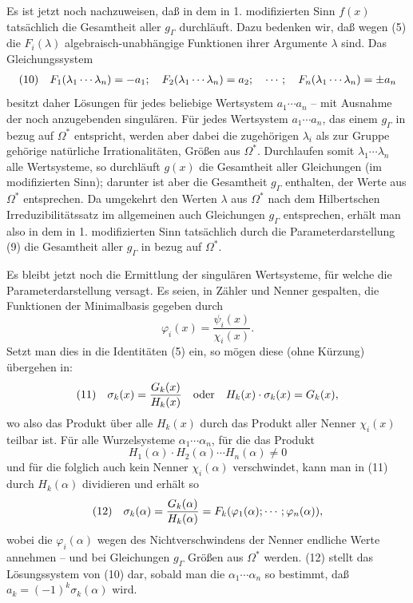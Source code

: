 Es ist jetzt noch nachzuweisen, daß in dem in 1. modifizierten Sinn $f(x)$ tatsächlich die Gesamtheit aller $g_\Gamma$ durchläuft. Dazu bedenken wir, daß wegen (5) die $F_i(\lambda)$ algebraisch-unabhängige Funktionen ihrer Argumente $\lambda$ sind. Das Gleichungssystem
\[
\begin{array}{@{}l@{\quad}l@{}}
(10)& \displaystyle F_1(\lambda_1\cdots\lambda_n)=-a_1;\quad F_2(\lambda_1\cdots\lambda_n)=a_2;\quad \cdots;\quad F_n(\lambda_1\cdots\lambda_n)=\pm a_n
\end{array}
\]
besitzt daher Lösungen für jedes beliebige Wertsystem $a_1\cdots a_n$ -- mit Ausnahme der noch anzugebenden singulären. Für jedes Wertsystem $a_1\cdots a_n$, das einem $g_\Gamma$ in bezug auf $\Omega^*$ entspricht, werden aber dabei die zugehörigen $\lambda_i$ als zur Gruppe gehörige natürliche Irrationalitäten, Größen aus $\Omega^*$. Durchlaufen somit $\lambda_1\cdots\lambda_n$ alle Wertsysteme, so durchläuft $g(x)$ die Gesamtheit aller Gleichungen (im modifizierten Sinn); darunter ist aber die Gesamtheit $g_\Gamma$ enthalten, der Werte aus $\Omega^*$ entsprechen. Da umgekehrt den Werten $\lambda$ aus $\Omega^*$ nach dem Hilbertschen Irreduzibilitätssatz \glqq{}im allgemeinen\grqq{} auch Gleichungen $g_\Gamma$ entsprechen, erhält man also in dem in 1. modifizierten Sinn tatsächlich durch die Parameterdarstellung (9) die Gesamtheit aller $g_\Gamma$ in bezug auf $\Omega^*$.

Es bleibt jetzt noch die Ermittlung der singulären Wertsysteme, für welche die Parameterdarstellung versagt. Es seien, in Zähler und Nenner gespalten, die Funktionen der Minimalbasis gegeben durch
\[
\varphi_i(x)=\frac{\psi_i(x)}{\chi_i(x)}.
\]
Setzt man dies in die Identitäten (5) ein, so mögen diese (ohne Kürzung) übergehen in:
\[
\begin{array}{@{}l@{\quad}l@{}}
(11)& \displaystyle \sigma_k(x)=\frac{G_k(x)}{H_k(x)}\quad\text{oder}\quad H_k(x)\cdot\sigma_k(x)=G_k(x),
\end{array}
\]
wo also das Produkt über alle $H_k(x)$ durch das Produkt aller Nenner $\chi_i(x)$ teilbar ist. Für alle Wurzelsysteme $\alpha_1\cdots\alpha_n$, für die das Produkt
\[
H_1(\alpha)\cdot H_2(\alpha)\cdots H_n(\alpha)\neq0
\]
und für die folglich auch kein Nenner $\chi_i(\alpha)$ verschwindet, kann man in (11) durch $H_k(\alpha)$ dividieren und erhält so
\[
\begin{array}{@{}l@{\quad}l@{}}
(12)& \displaystyle \sigma_k(\alpha)=\frac{G_k(\alpha)}{H_k(\alpha)}=F_k(\varphi_1(\alpha);\cdots;\varphi_n(\alpha)),
\end{array}
\]
wobei die $\varphi_i(\alpha)$ wegen des Nichtverschwindens der Nenner endliche Werte annehmen -- und bei Gleichungen $g_\Gamma$ Größen aus $\Omega^*$ werden. (12) stellt das Lösungssystem von (10) dar, sobald man die $\alpha_1\cdots\alpha_n$ so bestimmt, daß $a_k=(-1)^k\sigma_k(\alpha)$ wird.

